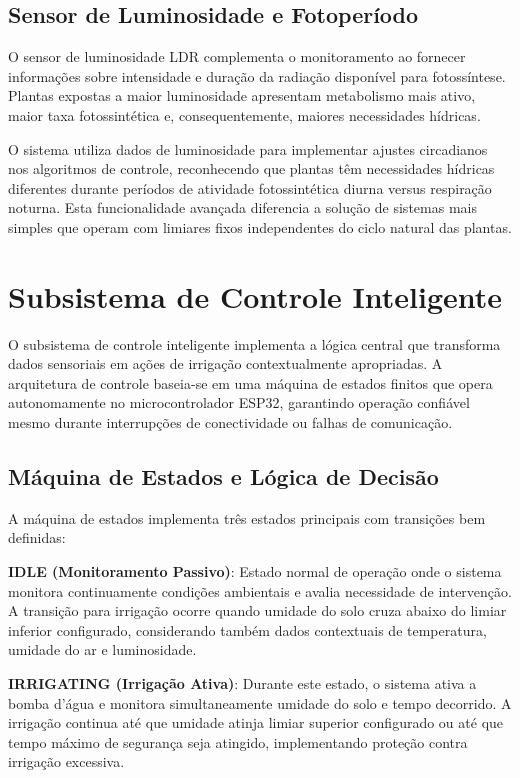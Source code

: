\subsection{Sensor de Luminosidade e Fotoperíodo}

O sensor de luminosidade LDR complementa o monitoramento ao fornecer informações sobre intensidade e duração da radiação disponível para fotossíntese. Plantas expostas a maior luminosidade apresentam metabolismo mais ativo, maior taxa fotossintética e, consequentemente, maiores necessidades hídricas.

O sistema utiliza dados de luminosidade para implementar ajustes circadianos nos algoritmos de controle, reconhecendo que plantas têm necessidades hídricas diferentes durante períodos de atividade fotossintética diurna versus respiração noturna. Esta funcionalidade avançada diferencia a solução de sistemas mais simples que operam com limiares fixos independentes do ciclo natural das plantas.

\section{Subsistema de Controle Inteligente}

O subsistema de controle inteligente implementa a lógica central que transforma dados sensoriais em ações de irrigação contextualmente apropriadas. A arquitetura de controle baseia-se em uma máquina de estados finitos que opera autonomamente no microcontrolador ESP32, garantindo operação confiável mesmo durante interrupções de conectividade ou falhas de comunicação.

\subsection{Máquina de Estados e Lógica de Decisão}

A máquina de estados implementa três estados principais com transições bem definidas:

\textbf{IDLE (Monitoramento Passivo)}: Estado normal de operação onde o sistema monitora continuamente condições ambientais e avalia necessidade de intervenção. A transição para irrigação ocorre quando umidade do solo cruza abaixo do limiar inferior configurado, considerando também dados contextuais de temperatura, umidade do ar e luminosidade.

\textbf{IRRIGATING (Irrigação Ativa)}: Durante este estado, o sistema ativa a bomba d'água e monitora simultaneamente umidade do solo e tempo decorrido. A irrigação continua até que umidade atinja limiar superior configurado ou até que tempo máximo de segurança seja atingido, implementando proteção contra irrigação excessiva.

